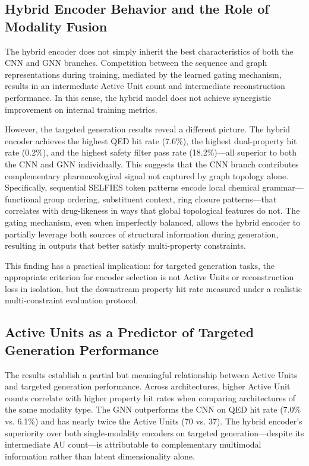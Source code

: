 \documentclass[conference]{IEEEtran}
\begin{document}
\subsection{Hybrid Encoder Behavior and the Role of Modality Fusion}

The hybrid encoder does not simply inherit the best characteristics of both the CNN and GNN branches. Competition between the sequence and graph representations during training, mediated by the learned gating mechanism, results in an intermediate Active Unit count and intermediate reconstruction performance. In this sense, the hybrid model does not achieve synergistic improvement on internal training metrics.

However, the targeted generation results reveal a different picture. The hybrid encoder achieves the highest QED hit rate (7.6\%), the highest dual-property hit rate (0.2\%), and the highest safety filter pass rate (18.2\%)---all superior to both the CNN and GNN individually. This suggests that the CNN branch contributes complementary pharmacological signal not captured by graph topology alone. Specifically, sequential SELFIES token patterns encode local chemical grammar---functional group ordering, substituent context, ring closure patterns---that correlates with drug-likeness in ways that global topological features do not. The gating mechanism, even when imperfectly balanced, allows the hybrid encoder to partially leverage both sources of structural information during generation, resulting in outputs that better satisfy multi-property constraints.

This finding has a practical implication: for targeted generation tasks, the appropriate criterion for encoder selection is not Active Units or reconstruction loss in isolation, but the downstream property hit rate measured under a realistic multi-constraint evaluation protocol.

\subsection{Active Units as a Predictor of Targeted Generation Performance}

The results establish a partial but meaningful relationship between Active Units and targeted generation performance. Across architectures, higher Active Unit counts correlate with higher property hit rates when comparing architectures of the same modality type. The GNN outperforms the CNN on QED hit rate (7.0\% vs. 6.1\%) and has nearly twice the Active Units (70 vs. 37). The hybrid encoder's superiority over both single-modality encoders on targeted generation---despite its intermediate AU count---is attributable to complementary multimodal information rather than latent dimensionality alone.
\end{document}
